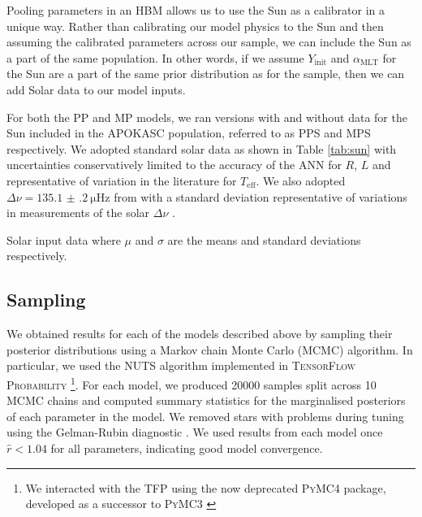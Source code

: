 \documentclass[a4paper,fleqn,usenatbib]{mnras}
\newcommand{\dnu}{\ensuremath{\Delta\nu}}
\newcommand{\teff}{\ensuremath{T_\mathrm{eff}}}
\newcommand{\mlt}{\ensuremath{{\alpha_\mathrm{MLT}}}}
\begin{document}

Pooling parameters in an HBM allows us to use the Sun as a calibrator in a unique way. Rather than calibrating our model physics to the Sun and then assuming the calibrated parameters across our sample, we can include the Sun as a part of the same population. In other words, if we assume $Y_\mathrm{init}$ and $\mlt$ for the Sun are a part of the same prior distribution as for the sample, then we can add Solar data to our model inputs.

For both the PP and MP models, we ran versions with and without data for the Sun included in the APOKASC population, referred to as PPS and MPS respectively. We adopted standard solar data as shown in Table \ref{tab:sun} with uncertainties conservatively limited to the accuracy of the ANN for $R$, $L$ and representative of variation in the literature for $\teff$. We also adopted $\dnu=\SI{135.1(2)}{\micro\hertz}$ from \citet{Huber.Bedding.ea2011} with a standard deviation representative of variations in measurements of the solar $\dnu$ \citep{Broomhall.Chaplin.ea2011}.

\begin{table}
    \centering
    \caption{Solar input data where $\mu$ and $\sigma$ are the means and standard deviations respectively.}
    \label{tab:sun}
    
\end{table}

\subsection{Sampling}

We obtained results for each of the models described above by sampling their posterior distributions using a Markov chain Monte Carlo (MCMC) algorithm. In particular, we used the NUTS algorithm implemented in \textsc{TensorFlow Probability} \citep[\textsc{TFP};][]{Abadi.Barham.ea2016, Dillon.Langmore.ea2017}\footnote{We interacted with the \textsc{TFP} using the now deprecated \textsc{PyMC4} package, developed as a successor to \textsc{PyMC3} \citep{Salvatier.Wiecki.ea2016}}. For each model, we produced \num{20000} samples split across \num{10} MCMC chains and computed summary statistics for the marginalised posteriors of each parameter in the model. We removed stars with problems during tuning using the Gelman-Rubin diagnostic \citep[$\hat{r}$;][]{Gelman.Rubin1992}. We used results from each model once $\hat{r} < 1.04$ for all parameters, indicating good model convergence.
\end{document}
